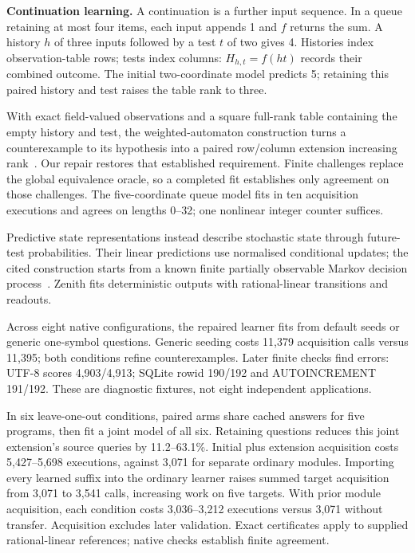 \documentclass[11pt]{article}
\begin{document}
\hypertarget{evolve}{}
\textbf{Continuation learning.}
A continuation is a further input sequence. In a queue retaining at most four
items, each input appends 1 and $f$ returns the sum. A history $h$ of three inputs
followed by a test $t$ of two gives 4. Histories index observation-table rows;
tests index columns: $H_{h,t}=f(ht)$ records their combined outcome.
The initial two-coordinate model predicts 5; retaining this paired history
and test raises the table rank to three.

With exact field-valued observations and a square full-rank table containing
the empty history and test, the weighted-automaton construction turns a
counterexample to its hypothesis into a paired row/column extension increasing rank~\cite[Proposition 1, pp.\ 2--3]{weighted}.
Our repair restores that established requirement. Finite challenges replace
the global equivalence oracle, so a completed fit establishes only agreement
on those challenges. The five-coordinate queue model fits in ten acquisition
executions and agrees on lengths 0--32; one nonlinear integer counter suffices.

Predictive state representations instead describe stochastic state through
future-test probabilities. Their linear predictions use normalised conditional
updates; the cited construction starts from a known finite partially observable
Markov decision process~\cite[\S1, Eq.\ (3); Theorem 1 and \S2]{psr}.
Zenith fits deterministic outputs with rational-linear transitions and readouts.

\hypertarget{trace}{}
Across eight native configurations, the repaired learner fits from default seeds
or generic one-symbol questions. Generic seeding costs 11,379 acquisition calls
versus 11,395; both conditions refine counterexamples. Later finite checks
find errors: UTF-8 scores 4,903/4,913; SQLite rowid 190/192 and AUTOINCREMENT
191/192. These are diagnostic fixtures, not eight independent applications.

In six leave-one-out conditions, paired arms share cached answers for five programs,
then fit a joint model of all six. Retaining questions reduces this joint
extension's source queries by 11.2--63.1\%. Initial plus extension acquisition
costs 5,427--5,698 executions, against 3,071 for separate ordinary modules.
Importing every learned suffix into the ordinary learner raises summed target
acquisition from 3,071 to 3,541 calls, increasing work on five targets. With prior
module acquisition, each condition costs 3,036--3,212 executions versus 3,071
without transfer. Acquisition excludes later validation. Exact certificates
apply to supplied rational-linear references; native checks establish finite agreement.
\end{document}
